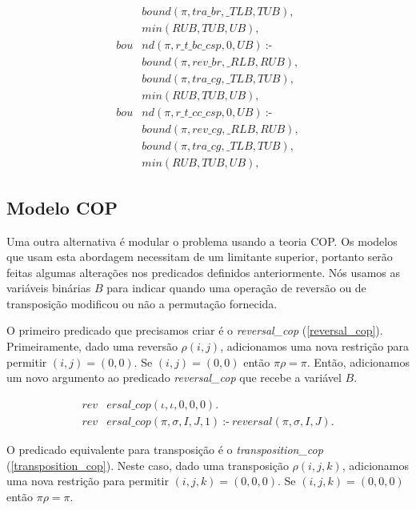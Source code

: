 \begin{align}
  &\textit{bound}(\pi, tra\_br, \_TLB, TUB), \nonumber\\
  &\textit{min}(RUB, TUB, UB), \nonumber\\
  \textit{bou}&\textit{nd}(\pi, r\_t\_bc\_csp, 0, UB)~\text{:-} \nonumber\\
  &\textit{bound}(\pi, rev\_br, \_RLB, RUB), \nonumber\\
  &\textit{bound}(\pi, tra\_cg, \_TLB, TUB), \nonumber\\
  &\textit{min}(RUB, TUB, UB), \nonumber\\
  \textit{bou}&\textit{nd}(\pi, r\_t\_cc\_csp, 0, UB)~\text{:-} \nonumber\\
  &\textit{bound}(\pi, rev\_cg, \_RLB, RUB), \nonumber\\
  &\textit{bound}(\pi, tra\_cg, \_TLB, TUB), \nonumber\\
  &\textit{min}(RUB, TUB, UB), \nonumber
\end{align}

\subsection{Modelo COP}
\label{modelcop}
Uma outra alternativa é modular o problema usando a teoria COP. Os
modelos que usam esta abordagem necessitam de um limitante superior,
portanto serão feitas algumas alterações nos predicados definidos
anteriormente. Nós usamos as variáveis binárias $B$ para indicar
quando uma operação de reversão ou de transposição modificou ou não a
permutação fornecida.

O primeiro predicado que precisamos criar é o \textit{reversal\_cop}
(\ref{reversal_cop}). Primeiramente, dado uma reversão $\rho(i, j)$,
adicionamos uma nova restrição para permitir $(i, j) = (0, 0)$. Se
$(i, j) = (0, 0)$ então $\pi\rho = \pi$. Então, adicionamos um novo
argumento ao predicado \textit{reversal\_cop} que recebe a variável
$B$.

\begin{align}
  \label{reversal_cop}
  \textit{rev}&\textit{ersal\_cop}(\iota, \iota, 0, 0, 0). \\
  \textit{rev}&\textit{ersal\_cop}(\pi, \sigma, I, J, 1)~\text{:-}~ 
  \textit{reversal}(\pi, \sigma, I, J). \nonumber
\end{align}

O predicado equivalente para transposição é
o \textit{transposition\_cop} (\ref{transposition_cop}). Neste caso,
dado uma transposição $\rho(i, j, k)$, adicionamos uma nova restrição
para permitir $(i, j, k) = (0, 0, 0)$. Se $(i, j, k) = (0, 0, 0)$ então
$\pi\rho = \pi$.

